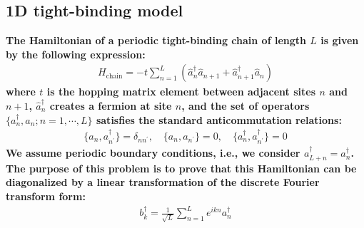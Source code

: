 \documentclass[../../main.tex]{subfiles}
\begin{document}
\subsection{1D tight-binding model}
\textbf{The Hamiltonian of a periodic tight-binding chain of length $L$ is given by the following expression:%
\begin{align*}
  H_{\text{chain}} = -t\sum_{n = 1}^{L}\left(\hat{a}_{n}^{\dagger}\hat{a}_{n+1} + \hat{a}_{n+1}^{\dagger}\hat{a}_{n}\right)
\end{align*}
where $t$ is the hopping matrix element between adjacent sites $n$ and $n + 1$, $\hat{a}_{n}^{\dagger}$ creates a fermion at site $n$, and the set of operators $\{a_{n}^{\dagger}, a_{n}; n = 1,\cdots, L\}$ satisfies the standard anticommutation relations: %
\begin{align*}
  \{a_{n},a_{n^{\prime}}^{\dagger}\} = \delta_{nn^{\prime}},\quad \{a_{n},a_{n^{\prime}}\} = 0,\quad \{a_{n}^{\dagger},a_{n^{\prime}}^{\dagger}\} = 0
\end{align*}
We assume periodic boundary conditions, i.e., we consider $a_{L+n}^{\dagger} = a_{n}^{\dagger}$.%
The purpose of this problem is to prove that this Hamiltonian can be diagonalized by a linear transformation of the discrete Fourier transform form:%
\begin{align*}
  b^{\dagger}_{k} = \frac{1}{\sqrt{L}}\sum_{n = 1}^{L}e^{ikn}a_{n}^{\dagger}
\end{align*}}
\end{document}
